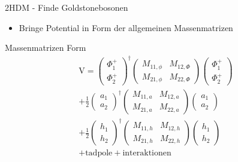 \documentclass{beamer}
\begin{document}
\begin{frame}{2HDM - Finde Goldstonebosonen}
\begin{itemize}
\item Bringe Potential in Form der allgemeinen Massenmatrizen
 \end{itemize}
 \begin{block}{Massenmatrizen Form}
 \begin{equation*}
 \begin{split}
\text{V}=\left( \begin{array}{c} \Phi^{+}_{1}\\ \Phi^{+}_{2} \end{array}\right)^{\dagger} \begin{pmatrix} M_{11,\phi} & M_{12,\Phi} \\  M_{21,\phi} & M_{22,\Phi}\end{pmatrix} \left( \begin{array}{c} \Phi^{+}_{1}\\ \Phi^{+}_{2} \end{array}\right)
\\
+\frac{1}{2}\left( \begin{array}{c} a_{1}\\ a_{2} \end{array}\right)^{\dagger} \begin{pmatrix} M_{11,a} & M_{12,a} \\  M_{21,a} & M_{22,a}\end{pmatrix} \left( \begin{array}{c}a_{1}\\ a_{2} \end{array}\right)
\\
+\frac{1}{2}\left( \begin{array}{c} h_{1}\\ h_{2} \end{array}\right)^{\dagger} \begin{pmatrix} M_{11,h} & M_{12,h} \\  M_{21,h} & M_{22,h}\end{pmatrix} \left( \begin{array}{c}h_{1}\\ h_{2} \end{array}\right) 
\\
+ \text{tadpole}+\text{interaktionen}
\end{split}
\end{equation*} 

\end{block}

\end{frame}
\end{document}
